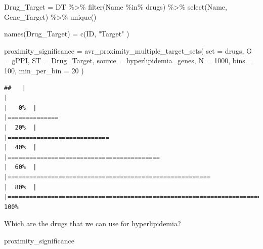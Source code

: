 \documentclass[
]{book}
\newenvironment{Shaded}{\begin{snugshade}}{\end{snugshade}}
\newcommand{\AttributeTok}[1]{\textcolor[rgb]{0.77,0.63,0.00}{#1}}
\newcommand{\DecValTok}[1]{\textcolor[rgb]{0.00,0.00,0.81}{#1}}
\newcommand{\FunctionTok}[1]{\textcolor[rgb]{0.00,0.00,0.00}{#1}}
\newcommand{\NormalTok}[1]{#1}
\newcommand{\OtherTok}[1]{\textcolor[rgb]{0.56,0.35,0.01}{#1}}
\newcommand{\SpecialCharTok}[1]{\textcolor[rgb]{0.00,0.00,0.00}{#1}}
\newcommand{\StringTok}[1]{\textcolor[rgb]{0.31,0.60,0.02}{#1}}
\begin{document}
\begin{Shaded}
\begin{Highlighting}[]
\NormalTok{Drug\_Target }\OtherTok{=}\NormalTok{ DT }\SpecialCharTok{\%\textgreater{}\%} 
  \FunctionTok{filter}\NormalTok{(Name }\SpecialCharTok{\%in\%}\NormalTok{ drugs) }\SpecialCharTok{\%\textgreater{}\%} 
  \FunctionTok{select}\NormalTok{(Name, Gene\_Target) }\SpecialCharTok{\%\textgreater{}\%} 
  \FunctionTok{unique}\NormalTok{()}

\FunctionTok{names}\NormalTok{(Drug\_Target) }\OtherTok{=} \FunctionTok{c}\NormalTok{(}\StringTok{\textquotesingle{}ID\textquotesingle{}}\NormalTok{, }\StringTok{"Target"}\NormalTok{ )}

\NormalTok{proximity\_significance }\OtherTok{=} \FunctionTok{avr\_proximity\_multiple\_target\_sets}\NormalTok{(}
  \AttributeTok{set =}\NormalTok{ drugs,}
  \AttributeTok{G =}\NormalTok{ gPPI,}
  \AttributeTok{ST =}\NormalTok{ Drug\_Target,}
  \AttributeTok{source =}\NormalTok{ hyperlipidemia\_genes,}
  \AttributeTok{N =} \DecValTok{1000}\NormalTok{,}
  \AttributeTok{bins =} \DecValTok{100}\NormalTok{,}
  \AttributeTok{min\_per\_bin =} \DecValTok{20}
\NormalTok{)}
\end{Highlighting}
\end{Shaded}

\begin{verbatim}
##   |                                                                              |                                                                      |   0%  |                                                                              |==============                                                        |  20%  |                                                                              |============================                                          |  40%  |                                                                              |==========================================                            |  60%  |                                                                              |========================================================              |  80%  |                                                                              |======================================================================| 100%
\end{verbatim}

Which are the drugs that we can use for hyperlipidemia?

\begin{Shaded}
\begin{Highlighting}[]
\NormalTok{proximity\_significance}
\end{Highlighting}
\end{Shaded}
\end{document}
